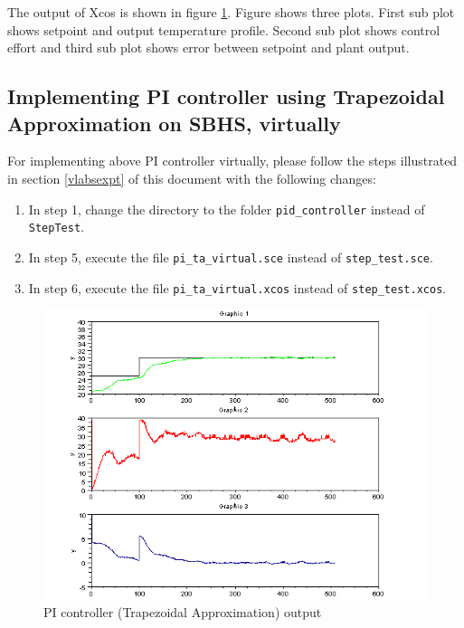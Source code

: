 The output of Xcos is shown in figure \ref{pi_ta}.
Figure shows three plots. First sub plot shows setpoint and output temperature profile. Second sub plot shows 
control effort and third sub plot shows error between setpoint and plant output.

\subsection{Implementing PI controller using Trapezoidal Approximation on SBHS, virtually}


For implementing above PI controller virtually, please follow the steps illustrated in section \ref{vlabsexpt} of this 
document with the following changes:
\begin{enumerate}

\item In step 1, change the directory to the folder {\tt pid\_controller} instead of {\tt StepTest}.
\item In step 5, execute the file {\tt pi\_ta\_virtual.sce} instead of {\tt step\_test.sce}.
\item In step 6, execute the file {\tt pi\_ta\_virtual.xcos} instead of {\tt step\_test.xcos}.

\end{enumerate}



\begin{figure}
\centering
\includegraphics[width=0.6\linewidth]{pid_manual/pi_ta}
\caption{PI controller (Trapezoidal Approximation) output}
\label{pi_ta}
\end{figure}
 
